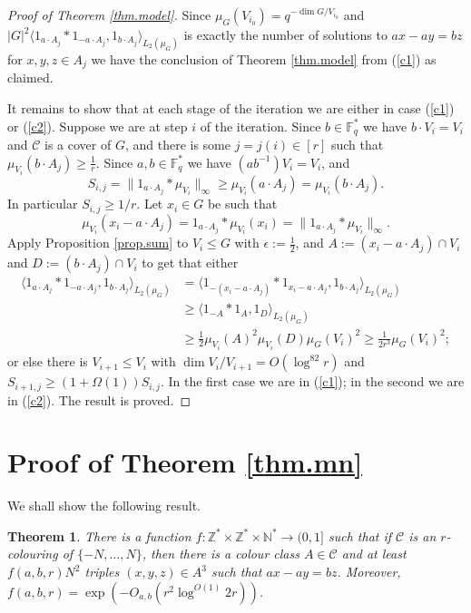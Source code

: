 \documentclass[12pt,reqno]{amsart}
\newtheorem{theorem}[subsection]{Theorem}
\providecommand{\Z}{\mathbb{Z}}
\providecommand{\N}{\mathbb{N}}
\providecommand{\F}{\mathbb{F}}
\numberwithin{equation}{section}
\begin{document}
\begin{proof}[Proof of Theorem \ref{thm.model}]
Since $\mu_G(V_{i_0})=q^{-\dim G/V_{i_0}}$ and $|G|^2\langle 1_{a\cdot A_j} \ast 1_{-a\cdot A_j},1_{b \cdot A_j}\rangle_{L_2(\mu_G)} $ is exactly the number of solutions to $ax-ay=bz$ for $x,y,z \in A_j$ we have the conclusion of Theorem \ref{thm.model} from (\ref{c1}) as claimed.

It remains to show that at each stage of the iteration we are either in case (\ref{c1}) or (\ref{c2}). Suppose we are at step $i$ of the iteration. Since $b \in \F_q^*$ we have $b\cdot V_i=V_i$ and $\mathcal{C}$ is a cover of $G$, and there is some $j=j(i) \in [r]$ such that $\mu_{V_i}(b\cdot A_j) \geq \frac{1}{r}$. Since $a,b \in \F_q^*$ we have $(ab^{-1})V_i=V_i$, and
\begin{equation*}
S_{i,j}=\|1_{a\cdot A_j}\ast \mu_{V_i}\|_\infty \geq \mu_{V_i}(a\cdot A_j) = \mu_{V_i}(b \cdot A_j).
\end{equation*}
In particular $S_{i,j} \geq 1/r$. Let $x_i\in G$ be such that 
\begin{equation*}
\mu_{V_i}(x_i-a \cdot A_j )=1_{a \cdot A_j} \ast \mu_{V_i}(x_i)=\|1_{a\cdot A_j}\ast \mu_{V_i}\|_\infty.
\end{equation*}
Apply Proposition \ref{prop.sum} to $V_i\leq G$ with $\epsilon:=\frac{1}{2}$, and $A:=(x_i-a \cdot A_j)\cap V_i$ and $D:=(b \cdot A_j)\cap V_i$ to get that either
\begin{align*}
\langle 1_{a \cdot A_j} \ast 1_{-a\cdot A_j}, 1_{b \cdot A_j}\rangle_{L_2(\mu_G)} & =  \langle 1_{-(x_i-a \cdot A_j)} \ast 1_{x_i-a\cdot A_j}, 1_{b \cdot A_j}\rangle_{L_2(\mu_G)}\\ &\geq \langle 1_{-A} \ast 1_{A},1_D\rangle_{L_2(\mu_{G})}\\ &\geq \frac{1}{2}\mu_{V_i}(A)^2\mu_{V_i}(D)\mu_G(V_i)^2 \geq \frac{1}{2r^3}\mu_G(V_i)^2;
\end{align*}
or else there is $V_{i+1} \leq V_i$ with $\dim V_i/V_{i+1}=O(\log^82r)$ and $S_{i+1,j} \geq (1+\Omega(1))S_{i,j}$.  In the first case we are in (\ref{c1}); in the second we are in (\ref{c2}). The result is proved.
\end{proof}

\section{Proof of Theorem \ref{thm.mn}}\label{sec.bourganised}

We shall show the following result.
\begin{theorem}\label{thm.keycount}
There is a function $f:\Z^*\times \Z^* \times \N^* \rightarrow (0,1]$ such that if $\mathcal{C}$ is an $r$-colouring of $\{-N,\dots,N\}$, then there is a colour class $A \in \mathcal{C}$ and at least $f(a,b,r)N^2$ triples $(x,y,z) \in A^3$ such that $ax-ay = bz$. Moreover, $f(a,b,r)=\exp(-O_{a,b}(r^2\log^{O(1)} 2r))$.
\end{theorem}
\end{document}

